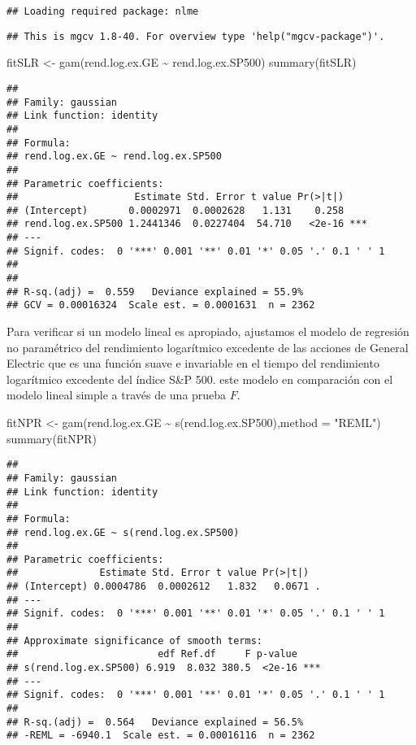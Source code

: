 \documentclass[
]{article}
\newenvironment{Shaded}{\begin{snugshade}}{\end{snugshade}}
\newcommand{\AttributeTok}[1]{\textcolor[rgb]{0.77,0.63,0.00}{#1}}
\newcommand{\FunctionTok}[1]{\textcolor[rgb]{0.00,0.00,0.00}{#1}}
\newcommand{\NormalTok}[1]{#1}
\newcommand{\OtherTok}[1]{\textcolor[rgb]{0.56,0.35,0.01}{#1}}
\newcommand{\SpecialCharTok}[1]{\textcolor[rgb]{0.00,0.00,0.00}{#1}}
\newcommand{\StringTok}[1]{\textcolor[rgb]{0.31,0.60,0.02}{#1}}
\begin{document}
\begin{verbatim}
## Loading required package: nlme
\end{verbatim}

\begin{verbatim}
## This is mgcv 1.8-40. For overview type 'help("mgcv-package")'.
\end{verbatim}

\begin{Shaded}
\begin{Highlighting}[]
\NormalTok{fitSLR }\OtherTok{\textless{}{-}} \FunctionTok{gam}\NormalTok{(rend.log.ex.GE }\SpecialCharTok{\textasciitilde{}}\NormalTok{ rend.log.ex.SP500)}
\FunctionTok{summary}\NormalTok{(fitSLR)}
\end{Highlighting}
\end{Shaded}

\begin{verbatim}
## 
## Family: gaussian 
## Link function: identity 
## 
## Formula:
## rend.log.ex.GE ~ rend.log.ex.SP500
## 
## Parametric coefficients:
##                    Estimate Std. Error t value Pr(>|t|)    
## (Intercept)       0.0002971  0.0002628   1.131    0.258    
## rend.log.ex.SP500 1.2441346  0.0227404  54.710   <2e-16 ***
## ---
## Signif. codes:  0 '***' 0.001 '**' 0.01 '*' 0.05 '.' 0.1 ' ' 1
## 
## 
## R-sq.(adj) =  0.559   Deviance explained = 55.9%
## GCV = 0.00016324  Scale est. = 0.0001631  n = 2362
\end{verbatim}

Para verificar si un modelo lineal es apropiado, ajustamos el modelo de
regresión no paramétrico del rendimiento logarítmico excedente de las
acciones de General Electric que es una función suave e invariable en el
tiempo del rendimiento logarítmico excedente del índice S\&P 500. este
modelo en comparación con el modelo lineal simple a través de una prueba
\(F\).

\begin{Shaded}
\begin{Highlighting}[]
\NormalTok{fitNPR }\OtherTok{\textless{}{-}} \FunctionTok{gam}\NormalTok{(rend.log.ex.GE }\SpecialCharTok{\textasciitilde{}} \FunctionTok{s}\NormalTok{(rend.log.ex.SP500),}\AttributeTok{method =} \StringTok{"REML"}\NormalTok{)}
\FunctionTok{summary}\NormalTok{(fitNPR)}
\end{Highlighting}
\end{Shaded}

\begin{verbatim}
## 
## Family: gaussian 
## Link function: identity 
## 
## Formula:
## rend.log.ex.GE ~ s(rend.log.ex.SP500)
## 
## Parametric coefficients:
##              Estimate Std. Error t value Pr(>|t|)  
## (Intercept) 0.0004786  0.0002612   1.832   0.0671 .
## ---
## Signif. codes:  0 '***' 0.001 '**' 0.01 '*' 0.05 '.' 0.1 ' ' 1
## 
## Approximate significance of smooth terms:
##                        edf Ref.df     F p-value    
## s(rend.log.ex.SP500) 6.919  8.032 380.5  <2e-16 ***
## ---
## Signif. codes:  0 '***' 0.001 '**' 0.01 '*' 0.05 '.' 0.1 ' ' 1
## 
## R-sq.(adj) =  0.564   Deviance explained = 56.5%
## -REML = -6940.1  Scale est. = 0.00016116  n = 2362
\end{verbatim}
\end{document}
